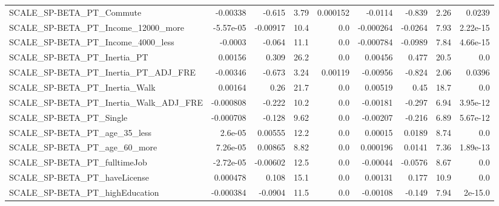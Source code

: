 \begin{tabular}{lrrrrrrrr}
SCALE\_SP-BETA\_PT\_Commute                           &    -0.00338 &       -0.615 &     3.79 & 0.000152 &    -0.0114 &      -0.839 &         2.26 &        0.0239 \\
SCALE\_SP-BETA\_PT\_Income\_12000\_more                 &   -5.57e-05 &     -0.00917 &     10.4 &      0.0 &  -0.000264 &     -0.0264 &         7.93 &      2.22e-15 \\
SCALE\_SP-BETA\_PT\_Income\_4000\_less                  &     -0.0003 &       -0.064 &     11.1 &      0.0 &  -0.000784 &     -0.0989 &         7.84 &      4.66e-15 \\
SCALE\_SP-BETA\_PT\_Inertia\_PT                        &     0.00156 &        0.309 &     26.2 &      0.0 &    0.00456 &       0.477 &         20.5 &           0.0 \\
SCALE\_SP-BETA\_PT\_Inertia\_PT\_ADJ\_FRE                &    -0.00346 &       -0.673 &     3.24 &  0.00119 &   -0.00956 &      -0.824 &         2.06 &        0.0396 \\
SCALE\_SP-BETA\_PT\_Inertia\_Walk                      &     0.00164 &         0.26 &     21.7 &      0.0 &    0.00519 &        0.45 &         18.7 &           0.0 \\
SCALE\_SP-BETA\_PT\_Inertia\_Walk\_ADJ\_FRE              &   -0.000808 &       -0.222 &     10.2 &      0.0 &   -0.00181 &      -0.297 &         6.94 &      3.95e-12 \\
SCALE\_SP-BETA\_PT\_Single                            &   -0.000708 &       -0.128 &     9.62 &      0.0 &   -0.00207 &      -0.216 &         6.89 &      5.67e-12 \\
SCALE\_SP-BETA\_PT\_age\_35\_less                       &     2.6e-05 &      0.00555 &     12.2 &      0.0 &    0.00015 &      0.0189 &         8.74 &           0.0 \\
SCALE\_SP-BETA\_PT\_age\_60\_more                       &    7.26e-05 &      0.00865 &     8.82 &      0.0 &   0.000196 &      0.0141 &         7.36 &      1.89e-13 \\
SCALE\_SP-BETA\_PT\_fulltimeJob                       &   -2.72e-05 &     -0.00602 &     12.5 &      0.0 &   -0.00044 &     -0.0576 &         8.67 &           0.0 \\
SCALE\_SP-BETA\_PT\_haveLicense                       &    0.000478 &        0.108 &     15.1 &      0.0 &    0.00131 &       0.177 &         10.9 &           0.0 \\
SCALE\_SP-BETA\_PT\_highEducation                     &   -0.000384 &      -0.0904 &     11.5 &      0.0 &   -0.00108 &      -0.149 &         7.94 &       2e-15.0 \\

\end{tabular}
